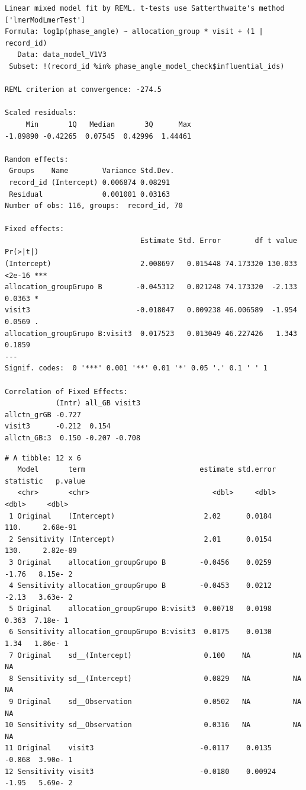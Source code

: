 \documentclass[
  12pt,
]{article}
\newenvironment{Shaded}{\begin{snugshade}}{\end{snugshade}}
\newcommand{\NormalTok}[1]{\textcolor[rgb]{0.00,0.23,0.31}{#1}}
\newcommand{\SpecialCharTok}[1]{\textcolor[rgb]{0.37,0.37,0.37}{#1}}
\begin{document}
\begin{verbatim}
Linear mixed model fit by REML. t-tests use Satterthwaite's method ['lmerModLmerTest']
Formula: log1p(phase_angle) ~ allocation_group * visit + (1 | record_id)
   Data: data_model_V1V3
 Subset: !(record_id %in% phase_angle_model_check$influential_ids)

REML criterion at convergence: -274.5

Scaled residuals: 
     Min       1Q   Median       3Q      Max 
-1.89890 -0.42265  0.07545  0.42996  1.44461 

Random effects:
 Groups    Name        Variance Std.Dev.
 record_id (Intercept) 0.006874 0.08291 
 Residual              0.001001 0.03163 
Number of obs: 116, groups:  record_id, 70

Fixed effects:
                                Estimate Std. Error        df t value Pr(>|t|)    
(Intercept)                     2.008697   0.015448 74.173320 130.033   <2e-16 ***
allocation_groupGrupo B        -0.045312   0.021248 74.173320  -2.133   0.0363 *  
visit3                         -0.018047   0.009238 46.006589  -1.954   0.0569 .  
allocation_groupGrupo B:visit3  0.017523   0.013049 46.227426   1.343   0.1859    
---
Signif. codes:  0 '***' 0.001 '**' 0.01 '*' 0.05 '.' 0.1 ' ' 1

Correlation of Fixed Effects:
            (Intr) all_GB visit3
allctn_grGB -0.727              
visit3      -0.212  0.154       
allctn_GB:3  0.150 -0.207 -0.708
\end{verbatim}

\begin{Shaded}
\end{Shaded}

\begin{verbatim}
# A tibble: 12 x 6
   Model       term                           estimate std.error statistic   p.value
   <chr>       <chr>                             <dbl>     <dbl>     <dbl>     <dbl>
 1 Original    (Intercept)                     2.02      0.0184    110.     2.68e-91
 2 Sensitivity (Intercept)                     2.01      0.0154    130.     2.82e-89
 3 Original    allocation_groupGrupo B        -0.0456    0.0259     -1.76   8.15e- 2
 4 Sensitivity allocation_groupGrupo B        -0.0453    0.0212     -2.13   3.63e- 2
 5 Original    allocation_groupGrupo B:visit3  0.00718   0.0198      0.363  7.18e- 1
 6 Sensitivity allocation_groupGrupo B:visit3  0.0175    0.0130      1.34   1.86e- 1
 7 Original    sd__(Intercept)                 0.100    NA          NA     NA       
 8 Sensitivity sd__(Intercept)                 0.0829   NA          NA     NA       
 9 Original    sd__Observation                 0.0502   NA          NA     NA       
10 Sensitivity sd__Observation                 0.0316   NA          NA     NA       
11 Original    visit3                         -0.0117    0.0135     -0.868  3.90e- 1
12 Sensitivity visit3                         -0.0180    0.00924    -1.95   5.69e- 2
\end{verbatim}
\end{document}
